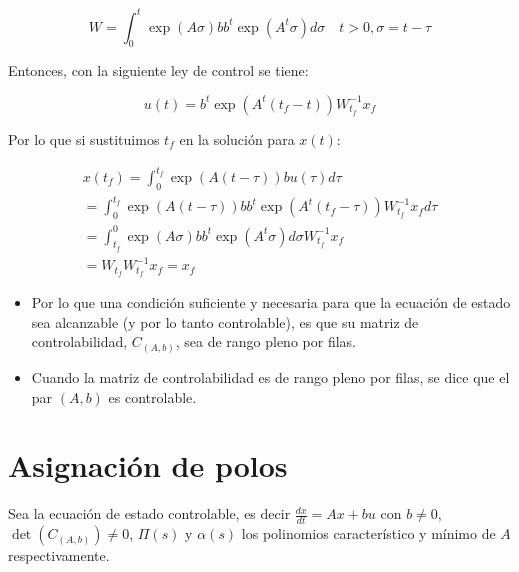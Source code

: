         \begin{equation}
            W = \int_0^t \exp{(A \sigma)} b b^t \exp{(A^t \sigma)} d\sigma \quad t > 0, \sigma = t - \tau
        \end{equation}

        Entonces, con la siguiente ley de control se tiene:

        \begin{equation}
            u(t) = b^t \exp{(A^t(t_f - t))} W_{t_f}^{-1} x_f
        \end{equation}

        Por lo que si sustituimos $t_f$ en la solución para $x(t)$:

        \begin{multline}
            x(t_f) = \int_0^{t_f} \exp{(A(t - \tau))} b u(\tau) d\tau \\
                   = \int_0^{t_f} \exp{(A(t - \tau))} b b^t \exp{(A^t(t_f - \tau))} W_{t_f}^{-1} x_f d\tau \\
                   = \int_{t_f}^0 \exp{(A \sigma)} b b^t \exp{(A^t \sigma)} d\sigma W_{t_f}^{-1} x_f \\
                   = W_{t_f} W_{t_f}^{-1} x_f = x_f
        \end{multline}

        \begin{itemize}
            \item Por lo que una condición suficiente y necesaria para que la ecuación de estado sea alcanzable (y por lo tanto controlable), es que su matriz de controlabilidad, $C_{(A,b)}$, sea de rango pleno por filas.
            \item Cuando la matriz de controlabilidad es de rango pleno por filas, se dice que el par $(A, b)$ es controlable.
        \end{itemize}


    \newpage
    \section{Asignación de polos}

        Sea la ecuación de estado controlable, es decir $\frac{dx}{dt} = Ax + bu$ con $b \ne 0$, $\det{(C_{(A,b)})} \ne 0$, $\Pi(s)$ y $\alpha(s)$ los polinomios característico y mínimo de $A$ respectivamente.

